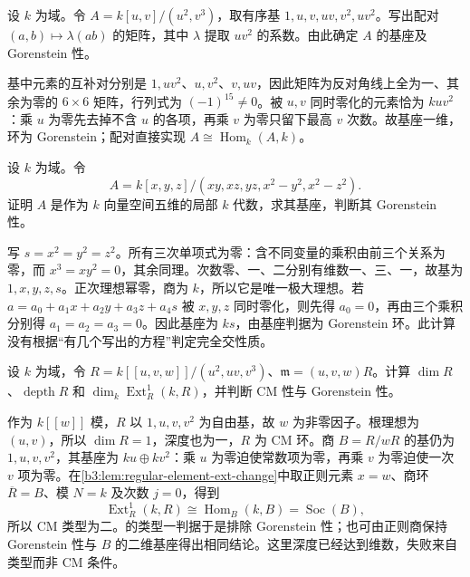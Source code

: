\begin{optionalexercise}\label{b3:ex:22-artinian-pairing}
	设 \(k\) 为域。令 \(A=k[u,v]/(u^2,v^3)\)，取有序基 \(1,u,v,uv,v^2,uv^2\)。写出配对 \((a,b)\mapsto\lambda(ab)\) 的矩阵，其中 \(\lambda\) 提取 \(uv^2\) 的系数。由此确定 \(A\) 的基座及 Gorenstein 性。
\end{optionalexercise}
\begin{solution}
	基中元素的互补对分别是 \(1,uv^2\)、\(u,v^2\)、\(v,uv\)，因此矩阵为反对角线上全为一、其余为零的 \(6\times6\) 矩阵，行列式为 \((-1)^{15}\ne0\)。被 \(u,v\) 同时零化的元素恰为 \(k uv^2\)：乘 \(u\) 为零先去掉不含 \(u\) 的各项，再乘 \(v\) 为零只留下最高 \(v\) 次数。故基座一维，环为 Gorenstein；配对直接实现 \(A\cong\operatorname{Hom}_k(A,k)\)。
\end{solution}

\begin{optionalexercise}\label{b3:ex:22-three-generators-gorenstein}
	设 \(k\) 为域。令
	\[
		A=k[x,y,z]/(xy,xz,yz,x^2-y^2,x^2-z^2).
	\]
	证明 \(A\) 是作为 \(k\) 向量空间五维的局部 \(k\) 代数，求其基座，判断其 Gorenstein 性。
\end{optionalexercise}
\begin{solution}
	写 \(s=x^2=y^2=z^2\)。所有三次单项式为零：含不同变量的乘积由前三个关系为零，而 \(x^3=xy^2=0\)，其余同理。次数零、一、二分别有维数一、三、一，故基为 \(1,x,y,z,s\)。正次理想幂零，商为 \(k\)，所以它是唯一极大理想。若 \(a=a_0+a_1x+a_2y+a_3z+a_4s\) 被 \(x,y,z\) 同时零化，则先得 \(a_0=0\)，再由三个乘积分别得 \(a_1=a_2=a_3=0\)。因此基座为 \(ks\)，由基座判据为 Gorenstein 环。此计算没有根据“有几个写出的方程”判定完全交性质。
\end{solution}

\begin{optionalexercise}\label{b3:ex:22-cm-not-gorenstein-positive-dimension}
	设 \(k\) 为域，令 \(R=k[\![u,v,w]\!]/(u^2,uv,v^3)\)、\(\mathfrak m=(u,v,w)R\)。计算 \(\dim R\)、\(\operatorname{depth}R\) 和 \(\dim_k\operatorname{Ext}_R^1(k,R)\)，并判断 CM 性与 Gorenstein 性。
\end{optionalexercise}
\begin{solution}
	作为 \(k[\![w]\!]\) 模，\(R\) 以 \(1,u,v,v^2\) 为自由基，故 \(w\) 为非零因子。根理想为 \((u,v)\)，所以 \(\dim R=1\)，深度也为一，\(R\) 为 CM 环。商 \(B=R/wR\) 的基仍为 \(1,u,v,v^2\)，其基座为 \(ku\oplus kv^2\)：乘 \(u\) 为零迫使常数项为零，再乘 \(v\) 为零迫使一次 \(v\) 项为零。在\cref{b3:lem:regular-element-ext-change}中取正则元素 \(x=w\)、商环 \(\overline R=B\)、模 \(N=k\) 及次数 \(j=0\)，得到
	\[
		\operatorname{Ext}_R^1(k,R)\cong\operatorname{Hom}_B(k,B) =\operatorname{Soc}(B),
	\]
	所以 CM 类型为二。的类型一判据于是排除 Gorenstein 性；也可由正则商保持 Gorenstein 性与 \(B\) 的二维基座得出相同结论。这里深度已经达到维数，失败来自类型而非 CM 条件。
\end{solution}

